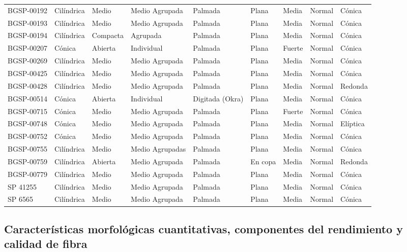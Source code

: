 \documentclass[12pt,oneside]{reedthesis}
\begin{document}
\begin{table}[!h]
{\begin{tabular}[t]{lllllllll}
\addlinespace
BGSP-00192 & Cilíndrica & Medio & Medio Agrupada & Palmada & Plana & Media & Normal & Cónica\\
BGSP-00193 & Cilíndrica & Medio & Medio Agrupada & Palmada & Plana & Media & Normal & Cónica\\
BGSP-00194 & Cilíndrica & Compacta & Agrupada & Palmada & Plana & Media & Normal & Cónica\\
BGSP-00207 & Cónica & Abierta & Individual & Palmada & Plana & Fuerte & Normal & Cónica\\
BGSP-00269 & Cilíndrica & Medio & Medio Agrupada & Palmada & Plana & Media & Normal & Cónica\\
\addlinespace
BGSP-00425 & Cilíndrica & Medio & Medio Agrupada & Palmada & Plana & Media & Normal & Cónica\\
BGSP-00428 & Cilíndrica & Medio & Medio Agrupada & Palmada & Plana & Media & Normal & Redonda\\
BGSP-00514 & Cónica & Abierta & Individual & Digitada (Okra) & Plana & Media & Normal & Cónica\\
BGSP-00715 & Cónica & Medio & Medio Agrupada & Palmada & Plana & Fuerte & Normal & Cónica\\
BGSP-00748 & Cónica & Medio & Medio Agrupada & Palmada & Plana & Media & Normal & Elíptica\\
\addlinespace
BGSP-00752 & Cónica & Medio & Medio Agrupada & Palmada & Plana & Media & Normal & Cónica\\
BGSP-00755 & Cilíndrica & Medio & Medio Agrupadas & Palmada & Plana & Media & Normal & Cónica\\
BGSP-00759 & Cilíndrica & Abierta & Medio Agrupada & Palmada & En copa & Media & Normal & Redonda\\
BGSP-00779 & Cilíndrica & Medio & Medio Agrupada & Palmada & Plana & Media & Normal & Cónica\\
SP 41255 & Cilíndrica & Medio & Medio Agrupada & Palmada & Plana & Media & Normal & Cónica\\
\addlinespace
SP 6565 & Cilíndrica & Medio & Medio Agrupada & Palmada & Plana & Media & Normal & Cónica\\
\bottomrule
\end{tabular}}
\end{table}

\subsection{Características morfológicas cuantitativas, componentes del rendimiento y calidad de fibra}\label{caracteruxedsticas-morfoluxf3gicas-cuantitativas-componentes-del-rendimiento-y-calidad-de-fibra}
\end{document}
